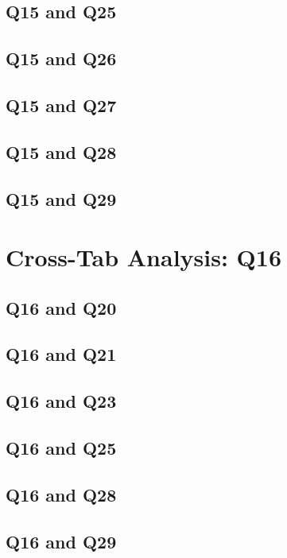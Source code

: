 \documentclass{report}
\begin{document}
\section{Q15 and Q25}\clearpage
\section{Q15 and Q26}\clearpage
\section{Q15 and Q27}\clearpage
\section{Q15 and Q28}\clearpage
\section{Q15 and Q29}\clearpage

\chapter{Cross-Tab Analysis: Q16}

\section{Q16 and Q20}\clearpage
\section{Q16 and Q21}\clearpage
\section{Q16 and Q23}\clearpage
\section{Q16 and Q25}\clearpage
\section{Q16 and Q28}\clearpage
\section{Q16 and Q29}\clearpage
\end{document}
